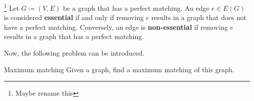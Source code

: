 \begin{definition}\footnote{Maybe rename this}
    Let \(G \coloneqq (V, E)\) be a graph that has a perfect matching.
    An edge \(e \in E(G)\) is considered \textbf{essential} if and only if removing \(e\) results in a graph that does not have a perfect matching.
    Conversely, an edge is \textbf{non-essential} if removing \(e\) results in a graph that has a perfect matching.
\end{definition}

Now, the following problem can be introduced.
\\
\begin{problem}{Maximum matching}
	Given a graph, find a maximum matching of this graph.
\end{problem}